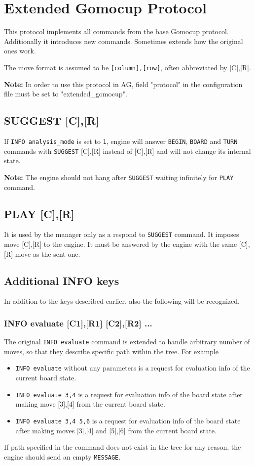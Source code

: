 \documentclass[12pt,a4paper]{article}
\begin{document}
\section{Extended Gomocup Protocol}
This protocol implements all commands from the base Gomocup protocol. Additionally it introduces new commands. Sometimes extends how the original ones work.

The move format is assumed to be \texttt{[column],[row]}, often abbreviated by [C],[R].

\textbf{Note:} In order to use this protocol in AG, field "protocol" in the configuration file must be set to "extended{\_}gomocup".

\subsection{SUGGEST [C],[R]}
\label{cmd_suggest}
If \texttt{INFO analysis{\_}mode} is set to \texttt{1}, engine will answer \texttt{BEGIN}, \texttt{BOARD} and \texttt{TURN} commands with \texttt{SUGGEST} [C],[R] instead of [C],[R] and will not change its internal state.

\textbf{Note:} The engine should not hang after \texttt{SUGGEST} waiting infinitely for \texttt{PLAY} command.


\subsection{PLAY [C],[R]}
\label{cmd_play}
It is used by the manager only as a respond to \texttt{SUGGEST} command. It imposes move [C],[R] to the engine. It must be answered by the engine with the same [C],[R] move as the sent one.


\subsection{Additional INFO keys}
\label{cmd_info_extension1}
In addition to the keys described earlier, also the following will be recognized.

\subsubsection{INFO evaluate [C1],[R1] [C2],[R2] ...}
The original \texttt{INFO evaluate} command is extended to handle arbitrary number of moves, so that they describe specific path within the tree. For example 
\begin{itemize}
\item{\texttt{INFO evaluate} without any parameters is a request for evaluation info of the current board state.}
\item{\texttt{INFO evaluate 3,4} is a request for evaluation info of the board state after making move [3],[4] from the current board state.}
\item{\texttt{INFO evaluate 3,4 5,6} is a request for evaluation info of the board state after making moves [3],[4] and [5],[6] from the current board state.}
\end{itemize}
If path specified in the command does not exist in the tree for any reason, the engine should send an empty \texttt{MESSAGE}.
\end{document}

